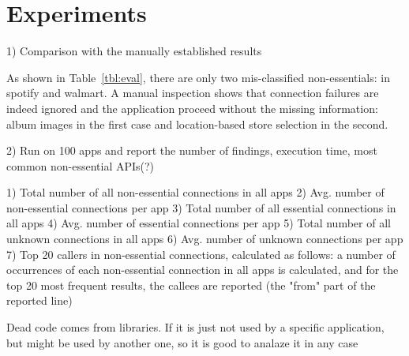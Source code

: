 \section{Experiments}
\label{sec:evaluation}


1) Comparison with the manually established results

As shown in Table~\ref{tbl:eval}, there are only two mis-classified non-essentials: in spotify and walmart. A manual inspection shows that connection failures are indeed ignored and the application proceed without the missing information: album images in the first case and location-based store selection in the second.



2) Run on 100 apps and report the number of findings, execution time, most common non-essential APIs(?) 

\begin{table}[t]
\caption{Analysis of 1045 Top-Popular Application from Google Play.}
\label{tbl:googlePlayApps}
\centering
\tabcolsep=1.5pt
\end{table}


1) Total number of all non-essential connections in all apps
2) Avg. number of non-essential connections per app
3) Total number of all essential connections in all apps
4) Avg. number of essential connections per app
5) Total number of all unknown connections in all apps
6) Avg. number of unknown connections per app
7) Top 20 callers in non-essential connections, calculated as follows:
a number of occurrences of each non-essential connection in all apps
is calculated, and for the top 20 most frequent results, the callees
are reported (the "from" part of the reported line)


Dead code comes from libraries. If 
it is just not used by a specific application, but might be used by another one, so it is good to analaze it in any case
